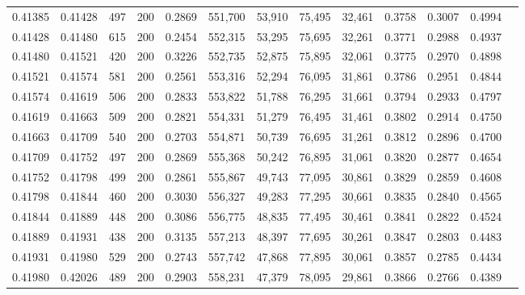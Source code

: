 \begin{tabular}{rrrrrrrrrrrrr}
0.41385 & 0.41428 &   497 & 200 &                                     0.2869 & 551,700 &  53,910 &  75,495 &  32,461 & 0.3758 & 0.3007 & 0.4994 \\
0.41428 & 0.41480 &   615 & 200 &                                     0.2454 & 552,315 &  53,295 &  75,695 &  32,261 & 0.3771 & 0.2988 & 0.4937 \\
0.41480 & 0.41521 &   420 & 200 &                                     0.3226 & 552,735 &  52,875 &  75,895 &  32,061 & 0.3775 & 0.2970 & 0.4898 \\
0.41521 & 0.41574 &   581 & 200 &                                     0.2561 & 553,316 &  52,294 &  76,095 &  31,861 & 0.3786 & 0.2951 & 0.4844 \\
0.41574 & 0.41619 &   506 & 200 &                                     0.2833 & 553,822 &  51,788 &  76,295 &  31,661 & 0.3794 & 0.2933 & 0.4797 \\
0.41619 & 0.41663 &   509 & 200 &                                     0.2821 & 554,331 &  51,279 &  76,495 &  31,461 & 0.3802 & 0.2914 & 0.4750 \\
0.41663 & 0.41709 &   540 & 200 &                                     0.2703 & 554,871 &  50,739 &  76,695 &  31,261 & 0.3812 & 0.2896 & 0.4700 \\
0.41709 & 0.41752 &   497 & 200 &                                     0.2869 & 555,368 &  50,242 &  76,895 &  31,061 & 0.3820 & 0.2877 & 0.4654 \\
0.41752 & 0.41798 &   499 & 200 &                                     0.2861 & 555,867 &  49,743 &  77,095 &  30,861 & 0.3829 & 0.2859 & 0.4608 \\
0.41798 & 0.41844 &   460 & 200 &                                     0.3030 & 556,327 &  49,283 &  77,295 &  30,661 & 0.3835 & 0.2840 & 0.4565 \\
0.41844 & 0.41889 &   448 & 200 &                                     0.3086 & 556,775 &  48,835 &  77,495 &  30,461 & 0.3841 & 0.2822 & 0.4524 \\
0.41889 & 0.41931 &   438 & 200 &                                     0.3135 & 557,213 &  48,397 &  77,695 &  30,261 & 0.3847 & 0.2803 & 0.4483 \\
0.41931 & 0.41980 &   529 & 200 &                                     0.2743 & 557,742 &  47,868 &  77,895 &  30,061 & 0.3857 & 0.2785 & 0.4434 \\
0.41980 & 0.42026 &   489 & 200 &                                     0.2903 & 558,231 &  47,379 &  78,095 &  29,861 & 0.3866 & 0.2766 & 0.4389 \\

\end{tabular}
